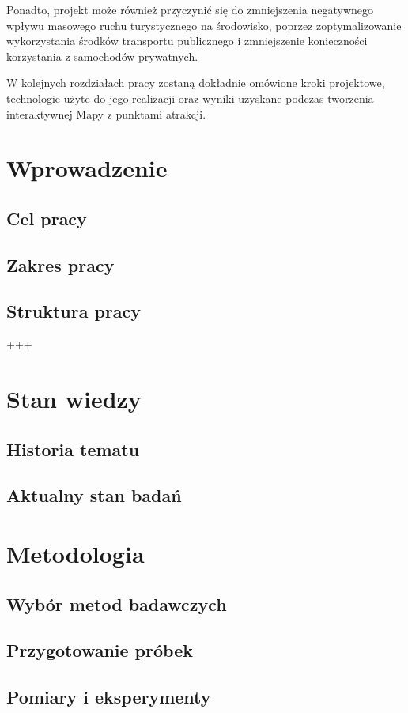 \documentclass{report}
\begin{document}
	Ponadto, projekt może również przyczynić się do zmniejszenia negatywnego wpływu masowego ruchu turystycznego na środowisko, poprzez zoptymalizowanie wykorzystania środków transportu publicznego i zmniejszenie konieczności korzystania z samochodów prywatnych.

	W kolejnych rozdziałach pracy zostaną dokładnie omówione kroki projektowe, technologie użyte do jego realizacji oraz wyniki uzyskane podczas tworzenia interaktywnej Mapy z punktami atrakcji.

	\chapter{Wprowadzenie}
	\section{Cel pracy}
	\section{Zakres pracy}
	\section{Struktura pracy}
	+++
	\chapter{Stan wiedzy}
	\section{Historia tematu}
	\section{Aktualny stan badań}

	\chapter{Metodologia}
	\section{Wybór metod badawczych}
	\section{Przygotowanie próbek}
	\section{Pomiary i eksperymenty}
\end{document}
